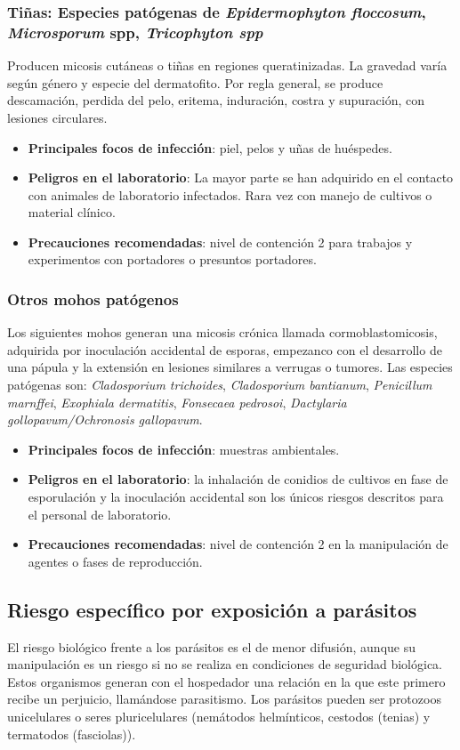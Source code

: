 \subsubsection{Tiñas: Especies patógenas de \textit{Epidermophyton floccosum}, \textit{Microsporum} spp, \textit{Tricophyton spp}}
Producen micosis cutáneas o tiñas en regiones queratinizadas. La gravedad varía según género y especie del dermatofito. Por regla general,  se produce descamación, perdida del pelo, eritema, induración, costra y supuración, con lesiones circulares.
\begin{itemize}[itemsep=0pt,parsep=0pt,topsep=0pt,partopsep=0pt]
    \item \textbf{Principales focos de infección}:  piel, pelos y uñas de huéspedes.
    \item \textbf{Peligros en el laboratorio}:  La mayor parte se han adquirido en el contacto con animales de laboratorio infectados. Rara vez con manejo de cultivos o material clínico.
    \item \textbf{Precauciones recomendadas}:  nivel de contención 2 para trabajos y experimentos con portadores o presuntos portadores.
\end{itemize}
\subsubsection{Otros mohos patógenos}
Los siguientes mohos generan una micosis crónica llamada cormoblastomicosis, adquirida por inoculación accidental de esporas, empezanco con el desarrollo de una pápula y la extensión en lesiones similares a verrugas o tumores. Las especies patógenas son: \textit{Cladosporium trichoides}, \textit{Cladosporium bantianum}, \textit{Penicillum marnffei}, \textit{Exophiala dermatitis}, \textit{Fonsecaea pedrosoi}, \textit{Dactylaria gollopavum/Ochronosis gallopavum}.
\begin{itemize}[itemsep=0pt,parsep=0pt,topsep=0pt,partopsep=0pt]
    \item \textbf{Principales focos de infección}:  muestras ambientales.
    \item \textbf{Peligros en el laboratorio}:  la inhalación de conidios de cultivos en fase de esporulación y la inoculación accidental son los únicos riesgos descritos para el personal de laboratorio.
    \item \textbf{Precauciones recomendadas}:  nivel de contención 2 en la manipulación de agentes o fases de reproducción.
\end{itemize}
\subsection{Riesgo específico por exposición a parásitos}
El riesgo biológico frente a los parásitos es el de menor difusión, aunque su manipulación es un riesgo si no se realiza en condiciones de seguridad biológica. Estos organismos generan con el hospedador una relación en la que este primero recibe un perjuicio, llamándose parasitismo. Los parásitos pueden ser protozoos unicelulares o seres pluricelulares (nemátodos helmínticos, cestodos (tenias) y termatodos (fasciolas)).
